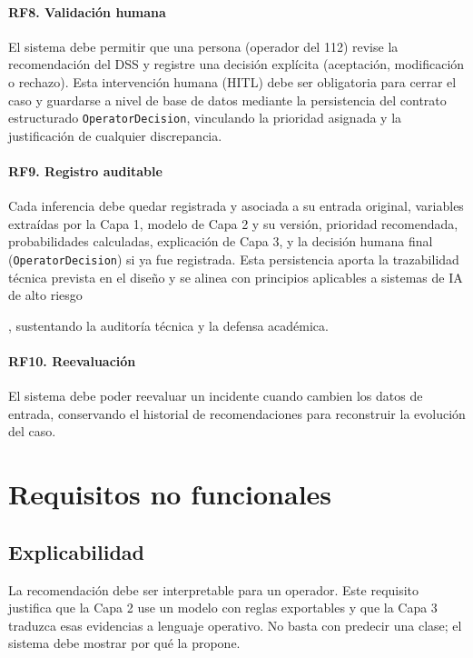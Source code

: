 \paragraph{RF8. Validación humana}
El sistema debe permitir que una persona (operador del 112) revise la recomendación del DSS y registre una decisión explícita (aceptación, modificación o rechazo). Esta intervención humana (HITL) debe ser obligatoria para cerrar el caso y guardarse a nivel de base de datos mediante la persistencia del contrato estructurado \texttt{OperatorDecision}, vinculando la prioridad asignada y la justificación de cualquier discrepancia.

\paragraph{RF9. Registro auditable}
Cada inferencia debe quedar registrada y asociada a su entrada original, variables extraídas por la Capa 1, modelo de Capa 2 y su versión, prioridad recomendada, probabilidades calculadas, explicación de Capa 3, y la decisión humana final (\texttt{OperatorDecision}) si ya fue registrada. Esta persistencia aporta la trazabilidad técnica prevista en el diseño y se alinea con principios aplicables a sistemas de IA de alto riesgo

\cite{EUAIAct2024}, sustentando la auditoría técnica y la defensa académica.

\paragraph{RF10. Reevaluación}
El sistema debe poder reevaluar un incidente cuando cambien los datos de entrada, conservando el historial de recomendaciones para reconstruir la evolución del caso.

\section{Requisitos no funcionales}

\subsection{Explicabilidad}

La recomendación debe ser interpretable para un operador. Este requisito justifica que la Capa 2 use un modelo con reglas exportables y que la Capa 3 traduzca esas evidencias a lenguaje operativo. No basta con predecir una clase; el sistema debe mostrar por qué la propone.

